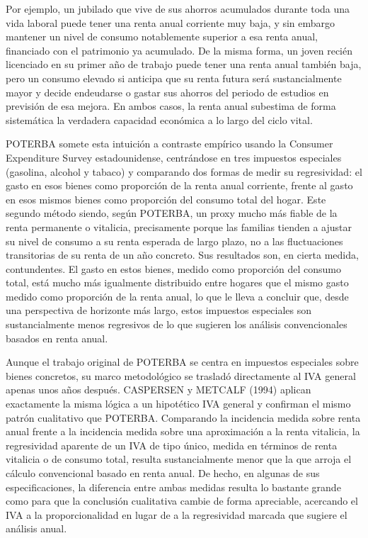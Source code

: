 \documentclass[10pt,a4paper]{article}
\begin{document}
Por ejemplo, un jubilado que vive de sus ahorros acumulados durante toda una vida laboral puede tener una renta anual corriente muy baja, y sin embargo mantener un nivel de consumo notablemente superior a esa renta anual, financiado con el patrimonio ya acumulado. De la misma forma, un joven recién licenciado en su primer año de trabajo puede tener una renta anual también baja, pero un consumo elevado si anticipa que su renta futura será sustancialmente mayor y decide endeudarse o gastar sus ahorros del periodo de estudios en previsión de esa mejora. En ambos casos, la renta anual subestima de forma sistemática la verdadera capacidad económica a lo largo del ciclo vital.

POTERBA somete esta intuición a contraste empírico usando la Consumer Expenditure Survey estadounidense, centrándose en tres impuestos especiales (gasolina, alcohol y tabaco) y comparando dos formas de medir su regresividad: el gasto en esos bienes como proporción de la renta anual corriente, frente al gasto en esos mismos bienes como proporción del consumo total del hogar. Este segundo método siendo, según POTERBA, un proxy mucho más fiable de la renta permanente o vitalicia, precisamente porque las familias tienden a ajustar su nivel de consumo a su renta esperada de largo plazo, no a las fluctuaciones transitorias de su renta de un año concreto. Sus resultados son, en cierta medida, contundentes. El gasto en estos bienes, medido como proporción del consumo total, está mucho más igualmente distribuido entre hogares que el mismo gasto medido como proporción de la renta anual, lo que le lleva a concluir que, desde una perspectiva de horizonte más largo, estos impuestos especiales son sustancialmente menos regresivos de lo que sugieren los análisis convencionales basados en renta anual.

Aunque el trabajo original de POTERBA se centra en impuestos especiales sobre bienes concretos, su marco metodológico se trasladó directamente al IVA general apenas unos años después. CASPERSEN y METCALF (1994) aplican exactamente la misma lógica a un hipotético IVA general y confirman el mismo patrón cualitativo que POTERBA. Comparando la incidencia medida sobre renta anual frente a la incidencia medida sobre una aproximación a la renta vitalicia, la regresividad aparente de un IVA de tipo único, medida en términos de renta vitalicia o de consumo total, resulta sustancialmente menor que la que arroja el cálculo convencional basado en renta anual. De hecho, en algunas de sus especificaciones, la diferencia entre ambas medidas resulta lo bastante grande como para que la conclusión cualitativa cambie de forma apreciable, acercando el IVA a la proporcionalidad en lugar de a la regresividad marcada que sugiere el análisis anual.
\end{document}
